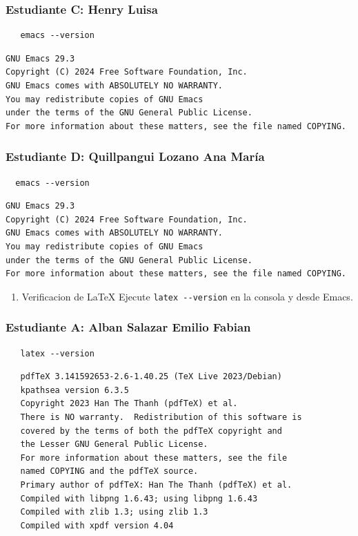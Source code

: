 \documentclass{article}
\begin{document}
\subsubsection{Estudiante C: Henry Luisa}
\label{sec:org58a5256}
\begin{verbatim}
   emacs --version
\end{verbatim}
\begin{verbatim}
GNU Emacs 29.3
Copyright (C) 2024 Free Software Foundation, Inc.
GNU Emacs comes with ABSOLUTELY NO WARRANTY.
You may redistribute copies of GNU Emacs
under the terms of the GNU General Public License.
For more information about these matters, see the file named COPYING.
\end{verbatim}

\subsubsection{Estudiante D: Quillpangui Lozano Ana María}
\label{sec:orgb402855}
\begin{verbatim}
  emacs --version
\end{verbatim}
\begin{verbatim}
GNU Emacs 29.3
Copyright (C) 2024 Free Software Foundation, Inc.
GNU Emacs comes with ABSOLUTELY NO WARRANTY.
You may redistribute copies of GNU Emacs
under the terms of the GNU General Public License.
For more information about these matters, see the file named COPYING.
\end{verbatim}



\begin{enumerate}
\item Verificacion de \LaTeX{}
Ejecute \texttt{latex -{}-{}version} en la consola y desde Emacs.
\end{enumerate}
\subsubsection{Estudiante A: Alban Salazar Emilio Fabian}
\label{sec:org46bf7fa}
\begin{verbatim}
   latex --version
\end{verbatim}
\begin{verbatim}
   pdfTeX 3.141592653-2.6-1.40.25 (TeX Live 2023/Debian)
   kpathsea version 6.3.5
   Copyright 2023 Han The Thanh (pdfTeX) et al.
   There is NO warranty.  Redistribution of this software is
   covered by the terms of both the pdfTeX copyright and
   the Lesser GNU General Public License.
   For more information about these matters, see the file
   named COPYING and the pdfTeX source.
   Primary author of pdfTeX: Han The Thanh (pdfTeX) et al.
   Compiled with libpng 1.6.43; using libpng 1.6.43
   Compiled with zlib 1.3; using zlib 1.3
   Compiled with xpdf version 4.04
\end{verbatim}
\end{document}
